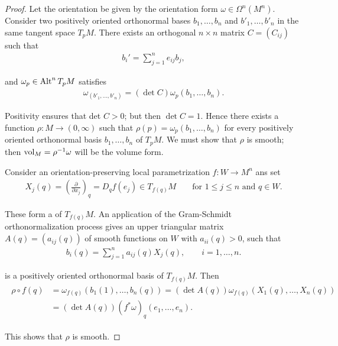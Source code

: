 \begin{proof}
  Let the orientation be given by the orientation form $\omega\in\Omega^n(M^n)$. Consider
two positively oriented orthonormal bases $b_1, \ldots, b_n$ and $b'_1, \ldots, b'_n$ in the 
same tangent space $T_pM$. There exists an orthogonal $n\times n$ matrix $C = (C_{ij})$ such 
that
\begin{align*}
  b_i' = \sum_{j=1}^{n }{e_{ij}b_j},
\end{align*}

and $\omega_p\in\operatorname{Alt}^n T_pM$ satisfies 
\begin{align}
  \omega_(b'_1, \ldots, b'_n) = (\det C) \omega_p (b_1, \ldots, b_n).
\end{align}

Positivity ensures that det $C > 0$; but then $\det C = 1$. Hence there exists a
function $\rho:M\to (0,\infty)$ such that $\rho(p) = \omega_p(b_1, \ldots, b_n)$ for every 
positively oriented orthonormal basis $b_1, \ldots, b_n$ of $T_pM$. We must show that $\rho$ is 
smooth; then $\mathrm{vol}_M = \rho^{-1}\omega$ will be the volume form.

Consider an orientation-preserving local parametrization $f:W\to M^n$ ans set 
\begin{align*}
  X_j(q) = \left(\frac{\partial }{\partial x_j }\right)_q 
  = D_q f(e_j) \in T_{f(q)}M 
  && \text{ for } 1\le j\le n\text{ and } q\in W.
\end{align*}

These form a  of $T_{f(q)}M$. An application of the
Gram-Schmidt orthonormalization process gives an upper triangular matrix
$A(q) = (a_{ij}(q))$ of smooth functions on $W$ with $a_{ii}(q) > 0$, such that
\begin{align}\label{eq:9-13}
  b_i(q) = \sum_{j=1 }^{n}{ a_{ij}(q)X_j(q) }, \qquad i=1, \ldots, n.
\end{align}

is a positively oriented orthonormal basis of $T_{f(q)}M$. Then
\begin{align}\label{eq:9-14}
  \begin{aligned}
    \rho\circ f(q) 
      & = \omega_{f(q)}(b_1(1), \ldots, b_n(q))
        = (\det A(q))\omega_{f(q)}(X_1(q), \ldots, X_n(q))\\
      & = (\det A(q))(f^*\omega)_q (e_1, \ldots, e_n).
  \end{aligned}
\end{align}

This shows that $\rho$ is smooth.
\end{proof}

